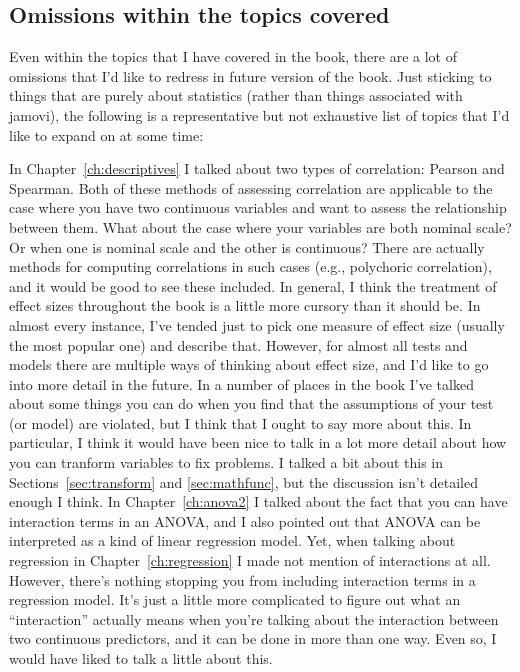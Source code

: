 \subsection{Omissions within the topics covered}

Even within the topics that I have covered in the book, there are a lot of omissions that I'd like to redress in future version of the book. Just sticking to things that are purely about statistics (rather than things associated with jamovi), the following is a representative but not exhaustive list of topics that I'd like to expand on at some time:
\begin{itemize}
 In Chapter~\ref{ch:descriptives} I talked about two types of correlation: Pearson and Spearman. Both of these methods of assessing correlation are applicable to the case where you have two continuous variables and want to assess the relationship between them. What about the case where your variables are both nominal scale? Or when one is nominal scale and the other is continuous? There are actually methods for computing correlations in such cases (e.g., polychoric correlation), and it would be good to see these included. 
 In general, I think the treatment of effect sizes throughout the book is a little more cursory than it should be. In almost every instance, I've tended just to pick one measure of effect size (usually the most popular one) and describe that. However, for almost all tests and models there are multiple ways of thinking about effect size, and I'd like to go into more detail in the future.
 In a number of places in the book I've talked about some things you can do when you find that the assumptions of your test (or model) are violated, but I think that I ought to say more about this. In particular, I think it would have been nice to talk in a lot more detail about how you can tranform variables to fix problems. I talked a bit about this in Sections~\ref{sec:transform} and \ref{sec:mathfunc}, but the discussion isn't detailed enough I think.
 In Chapter~\ref{ch:anova2} I talked about the fact that you can have interaction terms in an ANOVA, and I also pointed out that ANOVA can be interpreted as a kind of linear regression model. Yet, when talking about regression in Chapter~\ref{ch:regression} I made not mention of interactions at all. However, there's nothing stopping you from including interaction terms in a regression model. It's just a little more complicated to figure out what an ``interaction'' actually means when you're talking about the interaction between two continuous predictors, and it can be done in more than one way. Even so, I would have liked to talk a little about this. 

\end{itemize}
